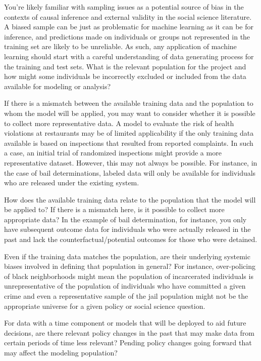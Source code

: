 \documentclass[]{krantz}
\begin{document}
You're likely familiar with sampling issues as a potential source of
bias in the contexts of causal inference and external validity in the
social science literature. A biased sample can be just as problematic
for machine learning as it can be for inference, and predictions made on
individuals or groups not represented in the training set are likely to
be unreliable. As such, any application of machine learning should start
with a careful understanding of data generating process for the training
and test sets. What is the relevant population for the project and how
might some individuals be incorrectly excluded or included from the data
available for modeling or analysis?

If there is a mismatch between the available training data and the
population to whom the model will be applied, you may want to consider
whether it is possible to collect more representative data. A model to
evaluate the risk of health violations at restaurants may be of limited
applicability if the only training data available is based on
inspections that resulted from reported complaints. In such a case, an
initial trial of randomized inspections might provide a more
representative dataset. However, this may not always be possible. For
instance, in the case of bail determinations, labeled data will only be
available for individuals who are released under the existing system.

How does the available training data relate to the population that the
model will be applied to? If there is a mismatch here, is it possible to
collect more appropriate data? In the example of bail determination, for
instance, you only have subsequent outcome data for individuals who were
actually released in the past and lack the counterfactual/potential
outcomes for those who were detained.

Even if the training data matches the population, are their underlying
systemic biases involved in defining that population in general? For
instance, over-policing of black neighborhoods might mean the population
of incarcerated individuals is unrepresentative of the population of
individuals who have committed a given crime and even a representative
sample of the jail population might not be the appropriate universe for
a given policy or social science question.

For data with a time component or models that will be deployed to aid
future decisions, are there relevant policy changes in the past that may
make data from certain periods of time less relevant? Pending policy
changes going forward that may affect the modeling population?
\end{document}
